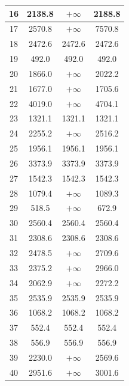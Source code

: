 \begin{longtable}{cccc}
\hline
16 & 2138.8 & $+\infty$ & 2188.8 \\
\hline
17 & 2570.8 & $+\infty$ & 7570.8 \\
\hline
18 & 2472.6 & 2472.6 & 2472.6 \\
\hline
19 & 492.0 & 492.0 & 492.0 \\
\hline
20 & 1866.0 & $+\infty$ & 2022.2 \\
\hline
21 & 1677.0 & $+\infty$ & 1705.6 \\
\hline
22 & 4019.0 & $+\infty$ & 4704.1 \\
\hline
23 & 1321.1 & 1321.1 & 1321.1 \\
\hline
24 & 2255.2 & $+\infty$ & 2516.2 \\
\hline
25 & 1956.1 & 1956.1 & 1956.1 \\
\hline
26 & 3373.9 & 3373.9 & 3373.9 \\
\hline
27 & 1542.3 & 1542.3 & 1542.3 \\
\hline
28 & 1079.4 & $+\infty$ & 1089.3 \\
\hline
29 & 518.5 & $+\infty$ & 672.9 \\
\hline
30 & 2560.4 & 2560.4 & 2560.4 \\
\hline
31 & 2308.6 & 2308.6 & 2308.6 \\
\hline
32 & 2478.5 & $+\infty$ & 2709.6 \\
\hline
33 & 2375.2 & $+\infty$ & 2966.0 \\
\hline
34 & 2062.9 & $+\infty$ & 2272.2 \\
\hline
35 & 2535.9 & 2535.9 & 2535.9 \\
\hline
36 & 1068.2 & 1068.2 & 1068.2 \\
\hline
37 & 552.4 & 552.4 & 552.4 \\
\hline
38 & 556.9 & 556.9 & 556.9 \\
\hline
39 & 2230.0 & $+\infty$ & 2569.6 \\
\hline
40 & 2951.6 & $+\infty$ & 3001.6 \\
\hline
\end{longtable}

